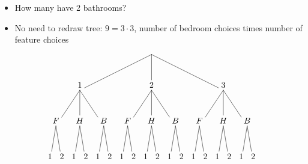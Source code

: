 \documentclass{beamer}
\theoremstyle{definition}
\begin{document}
\begin{frame}
\begin{itemize}
\item How many have 2 bathrooms?
\item No need to redraw tree:
$9=3\cdot 3$, number of bedroom choices times
number of feature choices
\end{itemize}
\[\begin{xy}<.5cm,0cm>:
(8.5,0)="0";
(2.5,-3)="1";
(8.5,-3)="2";
(14.5,-3)="3";
"0";"1"*+!D{1}**\dir{-};
"0";"2"*+!D{2}**\dir{-};
"0";"3"*+!D{3}**\dir{-};
(.5,-6)="11";
(2.5,-6)="12";
(4.5,-6)="13";
(6.5,-6)="21";
(8.5,-6)="22";
(10.5,-6)="23";
(12.5,-6)="31";
(14.5,-6)="32";
(16.5,-6)="33";
"1";"11"*+!D{F}**\dir{-};
"1";"12"*+!D{H}**\dir{-};
"1";"13"*+!D{B}**\dir{-};
"2";"21"*+!D{F}**\dir{-};
"2";"22"*+!D{H}**\dir{-};
"2";"23"*+!D{B}**\dir{-};
"3";"31"*+!D{F}**\dir{-};
"3";"32"*+!D{H}**\dir{-};
"3";"33"*+!D{B}**\dir{-};
"11";(0,-9)*+!D{1}**\dir{-};
"11";(1,-9)*+!D{2}**\dir{-};
"12";(2,-9)*+!D{1}**\dir{-};
"12";(3,-9)*+!D{2}**\dir{-};
"13";(4,-9)*+!D{1}**\dir{-};
"13";(5,-9)*+!D{2}**\dir{-};
"21";(6,-9)*+!D{1}**\dir{-};
"21";(7,-9)*+!D{2}**\dir{-};
"22";(8,-9)*+!D{1}**\dir{-};
"22";(9,-9)*+!D{2}**\dir{-};
"23";(10,-9)*+!D{1}**\dir{-};
"23";(11,-9)*+!D{2}**\dir{-};
"31";(12,-9)*+!D{1}**\dir{-};
"31";(13,-9)*+!D{2}**\dir{-};
"32";(14,-9)*+!D{1}**\dir{-};
"32";(15,-9)*+!D{2}**\dir{-};
"33";(16,-9)*+!D{1}**\dir{-};
"33";(17,-9)*+!D{2}**\dir{-};
\end{xy}\]
\end{frame}
\end{document}
